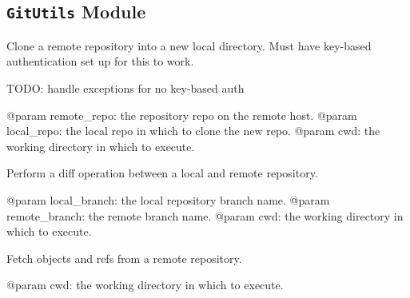 \documentclass[letterpaper,10pt,english]{sphinxmanual}
\begin{document}
\subsection{\texttt{GitUtils} Module}
\label{ref-manual/XrdTest:module-XrdTest.GitUtils}\label{ref-manual/XrdTest:gitutils-module}

\begin{fulllineitems}
\label{ref-manual/XrdTest:XrdTest.GitUtils.git_clone}
Clone a remote repository into a new local directory. Must have key-based
authentication set up for this to work.

TODO: handle exceptions for no key-based auth

@param remote\_repo: the repository repo on the remote host. 
@param local\_repo: the local repo in which to clone the new repo.
@param cwd: the working directory in which to execute.

\end{fulllineitems}


\begin{fulllineitems}
\label{ref-manual/XrdTest:XrdTest.GitUtils.git_diff}
Perform a diff operation between a local and remote repository.

@param local\_branch: the local repository branch name.
@param remote\_branch: the remote branch name.
@param cwd: the working directory in which to execute.

\end{fulllineitems}


\begin{fulllineitems}
\label{ref-manual/XrdTest:XrdTest.GitUtils.git_fetch}
Fetch objects and refs from a remote repository.

@param cwd: the working directory in which to execute.

\end{fulllineitems}

\end{document}
